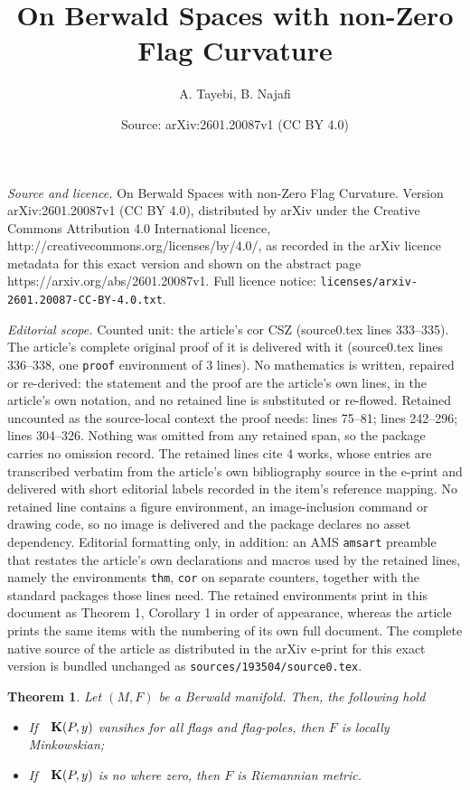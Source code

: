 \documentclass[10pt,a4paper]{amsart}
\title{On Berwald Spaces with non-Zero Flag Curvature}
\author{A. Tayebi, B. Najafi}
\date{Source: arXiv:2601.20087v1 (CC BY 4.0)}
\newtheorem{thm}{Theorem}
\begin{document}
\maketitle

\noindent\emph{Source and licence.} On Berwald Spaces with non-Zero Flag Curvature. Version arXiv:2601.20087v1 (CC BY 4.0), distributed by arXiv under the Creative Commons Attribution 4.0 International licence, http://creativecommons.org/licenses/by/4.0/, as recorded in the arXiv licence metadata for this exact version and shown on the abstract page https://arxiv.org/abs/2601.20087v1. Full licence notice: \texttt{licenses/arxiv-2601.20087-CC-BY-4.0.txt}.\par\smallskip

\noindent\textit{Editorial scope.} Counted unit: the article's cor CSZ (source0.tex lines 333--335). The article's complete original proof of it is delivered with it (source0.tex lines 336--338, one \texttt{proof} environment of 3 lines). No mathematics is written, repaired or re-derived: the statement and the proof are the article's own lines, in the article's own notation, and no retained line is substituted or re-flowed.  Retained uncounted as the source-local context the proof needs: lines 75--81; lines 242--296; lines 304--326.  Nothing was omitted from any retained span, so the package carries no omission record.  The retained lines cite 4 works, whose entries are transcribed verbatim from the article's own bibliography source in the e-print and delivered with short editorial labels recorded in the item's reference mapping.  No retained line contains a figure environment, an image-inclusion command or drawing code, so no image is delivered and the package declares no asset dependency.  Editorial formatting only, in addition: an AMS \texttt{amsart} preamble that restates the article's own declarations and macros used by the retained lines, namely the environments \texttt{thm}, \texttt{cor} on separate counters, together with the standard packages those lines need.  The retained environments print in this document as Theorem 1, Corollary 1 in order of appearance, whereas the article prints the same items with the numbering of its own full document.  The complete native source of the article as distributed in the arXiv e-print for this exact version is bundled unchanged as \texttt{sources/193504/source0.tex}.
\begin{thm}\label{MTHM}
Let $(M, F)$ be a Berwald manifold. Then, the following hold
\begin{itemize}
\item[1.] If\ \ ${\bf K}(P, y)$ vansihes for all flags and flag-poles, then $F$ is locally Minkowskian;
\item[2.] If\ \ ${\bf K}(P, y)$ is no where zero, then $F$ is Riemannian metric.
\end{itemize}
\end{thm}
\end{document}
